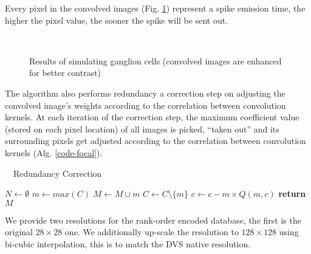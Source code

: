 Every pixel in the convolved images (Fig. \ref{fig-convolution-results}) 
represent a spike emission time, the higher the pixel value, the sooner the 
spike will be sent out.

\begin{figure}[hbt]
  \centering
  \\
  \caption{Results of simulating ganglion cells (convolved images are enhanced for better contrast)}
  \label{fig-convolution-results}
\end{figure}

The algorithm also performs redundancy a correction step on adjusting the 
convolved image's weights according to the correlation between convolution 
kernels. At each iteration of the correction step, the maximum coefficient  
value (stored on each pixel location) of all images is picked, ``taken out'' 
and its surrounding pixels get adjusted according to the correlation between 
convolution kernels (Alg. \ref{code-focal}).

\begin{algorithm}
  \caption{~~Redundancy Correction}
  \label{code-focal}
  \begin{algorithmic}
      \State $N \leftarrow \emptyset$ 
      \Repeat
        \State $m \leftarrow max(C)$ 
        \State $M \leftarrow M \cup m$ 
        \State $C \leftarrow C \setminus \{m\}$ 
         
           
            \State $c \leftarrow c - m \times Q(m, c)$
          \EndIf
        \EndFor
      \State \textbf{return} $M$
    \EndProcedure
  \end{algorithmic}
\end{algorithm}

We provide two resolutions for the rank-order encoded database, the first is 
the original $28\times28$ one. We additionally up-scale the resolution to 
$128\times128$ using bi-cubic interpolation, this is to match the DVS native 
resolution.